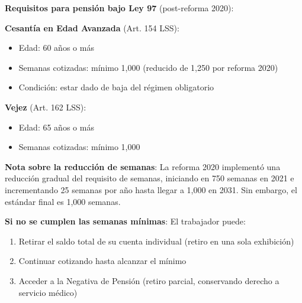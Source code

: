 \documentclass[11pt,a4paper]{report}
\begin{document}
\begin{tcolorbox}[colback=blue!5!white, colframe=blue!75!black, title=\textbf{Definici\'on Formal}]
\textbf{Requisitos para pensi\'on bajo Ley 97} (post-reforma 2020):

\textbf{Cesant\'ia en Edad Avanzada} (Art. 154 LSS):
\begin{itemize}[nosep]
\item Edad: 60 a\~nos o m\'as
\item Semanas cotizadas: m\'inimo 1,000 (reducido de 1,250 por reforma 2020)
\item Condici\'on: estar dado de baja del r\'egimen obligatorio
\end{itemize}

\textbf{Vejez} (Art. 162 LSS):
\begin{itemize}[nosep]
\item Edad: 65 a\~nos o m\'as
\item Semanas cotizadas: m\'inimo 1,000
\end{itemize}

\textbf{Nota sobre la reducci\'on de semanas}: La reforma 2020 implement\'o una reducci\'on gradual del requisito de semanas, iniciando en 750 semanas en 2021 e incrementando 25 semanas por a\~no hasta llegar a 1,000 en 2031. Sin embargo, el est\'andar final es 1,000 semanas.

\textbf{Si no se cumplen las semanas m\'inimas}: El trabajador puede:
\begin{enumerate}[nosep]
\item Retirar el saldo total de su cuenta individual (retiro en una sola exhibici\'on)
\item Continuar cotizando hasta alcanzar el m\'inimo
\item Acceder a la Negativa de Pensi\'on (retiro parcial, conservando derecho a servicio m\'edico)
\end{enumerate}
\end{tcolorbox}
\end{document}
